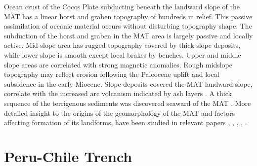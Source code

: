 \documentclass[11pt,a4paper]{report}
\begin{document}
Ocean crust of the Cocos Plate subducting beneath the landward slope of the \ac{MAT} has a linear horst and graben topography of hundreds m relief. This passive assimilation of oceanic material occurs without disturbing topography shape. The subduction of the horst and graben in the \ac{MAT} area is largely passive and locally active. Mid-slope area has rugged topography covered by thick slope deposits, while lower slope is smooth except local brakes by benches. Upper and middle slope areas are correlated with strong magnetic anomalies. Rough midslope topography may reflect erosion following the Paleocene uplift and local subsidence in the early Miocene. Slope deposits covered the \ac{MAT} landward slope, correlate with the increased arc volcanism indicated by ash layers \cite{Hueneetal1982}. A thick sequence of the terrigenous sediments was discovered seaward of the \ac{MAT} \cite{Shipboard495}. More detailed insight to the origins of the geomorphology of the \ac{MAT} and factors affecting formation of its landforms, have been studied in relevant papers \cite{Shipboard6}, \cite{AlvarezGomezetal2008}, \cite{Shipboard1982499}, \cite{AzemaTournon}, \cite{AlvarezGomezetal2012}.

\pagebreak
\section{Peru-Chile Trench}
\end{document}
